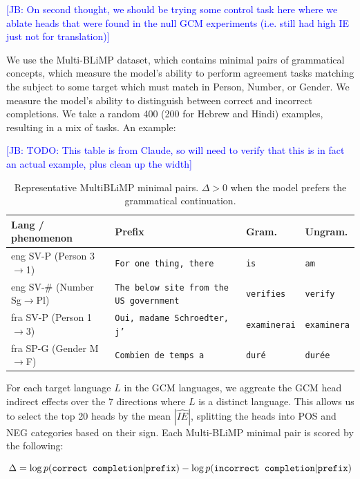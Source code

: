 \documentclass[11pt]{article}
\newcommand{\jb}[1]{\textcolor{blue}{[JB: #1]}}
\begin{document}
\jb{On second thought, we should be trying some control task here where we ablate heads that were found in the null GCM experiments (i.e. still had high IE just not for translation)}

We use the Multi-BLiMP dataset, which contains minimal pairs of grammatical concepts, which measure the model's ability to perform agreement tasks matching the subject to some target which must match in Person, Number, or Gender. We measure the model's ability to distinguish between correct and incorrect completions. We take a random 400 (200 for Hebrew and Hindi) examples, resulting in a mix of tasks. An example:

\jb{TODO: This table is from Claude, so will need to verify that this is in fact an actual example, plus clean up the width}
\begin{table}[t]
\centering
\small
\setlength{\tabcolsep}{3pt}
\renewcommand{\arraystretch}{1.08}
\begin{tabularx}{\linewidth}{@{}l X l l@{}}
\toprule
Lang / phenomenon & Prefix & Gram. & Ungram. \\
\midrule
eng SV-P (Person 3$\to$1) &
\texttt{For one thing, there} &
\texttt{is} &
\texttt{am} \\

eng SV-\# (Number Sg$\to$Pl) &
\texttt{The below site from the US government} &
\texttt{verifies} &
\texttt{verify} \\

fra SV-P (Person 1$\to$3) &
\texttt{Oui, madame Schroedter, j'} &
\texttt{examinerai} &
\texttt{examinera} \\

fra SP-G (Gender M$\to$F) &
\texttt{Combien de temps a} &
\texttt{duré} &
\texttt{durée} \\
\bottomrule
\end{tabularx}
\caption{Representative MultiBLiMP minimal pairs. $\Delta>0$ when the model prefers the grammatical continuation.}
\label{tab:multiblimp-examples}
\end{table}

For each target language $L$ in the GCM languages, we aggreate the GCM head indirect effects over the 7 directions where $L$ is a distinct language. This allows us to select the top 20 heads by the mean $|\widehat{IE}|$, splitting the heads into POS and NEG categories based on their sign. Each Multi-BLiMP minimal pair is scored by the following:

\begin{equation}
\Delta = \log p(\texttt{correct completion} | \texttt{prefix}) \\ - \log p(\texttt{incorrect completion} | \texttt{prefix})
\end{equation}
\end{document}
